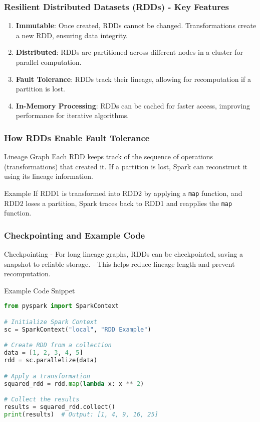 \documentclass[aspectratio=169]{beamer}
\begin{document}
\begin{frame}[fragile]
    \frametitle{Resilient Distributed Datasets (RDDs) - Key Features}
    \begin{enumerate}
        \item \textbf{Immutable}: Once created, RDDs cannot be changed. Transformations create a new RDD, ensuring data integrity.
        
        \item \textbf{Distributed}: RDDs are partitioned across different nodes in a cluster for parallel computation.

        \item \textbf{Fault Tolerance}: RDDs track their lineage, allowing for recomputation if a partition is lost.

        \item \textbf{In-Memory Processing}: RDDs can be cached for faster access, improving performance for iterative algorithms.
    \end{enumerate}
\end{frame}

\begin{frame}[fragile]
    \frametitle{How RDDs Enable Fault Tolerance}
    \begin{block}{Lineage Graph}
        Each RDD keeps track of the sequence of operations (transformations) that created it. If a partition is lost, Spark can reconstruct it using its lineage information.
    \end{block}
    \begin{exampleblock}{Example}
        If RDD1 is transformed into RDD2 by applying a \texttt{map} function, and RDD2 loses a partition, Spark traces back to RDD1 and reapplies the \texttt{map} function.
    \end{exampleblock}
\end{frame}

\begin{frame}[fragile]
    \frametitle{Checkpointing and Example Code}
    \begin{block}{Checkpointing}
        - For long lineage graphs, RDDs can be checkpointed, saving a snapshot to reliable storage. 
        - This helps reduce lineage length and prevent recomputation.
    \end{block}

    \begin{block}{Example Code Snippet}
        \begin{lstlisting}[language=Python]
from pyspark import SparkContext

# Initialize Spark Context
sc = SparkContext("local", "RDD Example")

# Create RDD from a collection
data = [1, 2, 3, 4, 5]
rdd = sc.parallelize(data)

# Apply a transformation
squared_rdd = rdd.map(lambda x: x ** 2)

# Collect the results
results = squared_rdd.collect()
print(results)  # Output: [1, 4, 9, 16, 25]
        \end{lstlisting}
    \end{block}
\end{frame}
\end{document}
